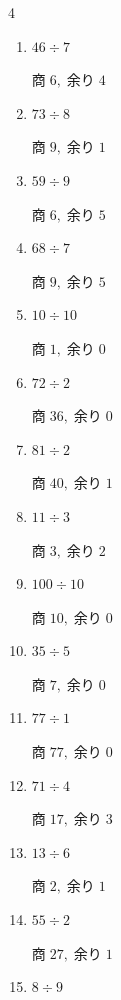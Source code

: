 \begin{multicols}{4}
\begin{enumerate}
        $商\; 9,\; 余り\; 1$

  \item $46 \div 7$

        $商\; 6,\; 余り\; 4$

  \item $73 \div 8$

        $商\; 9,\; 余り\; 1$

  \item $59 \div 9$

        $商\; 6,\; 余り\; 5$

\columnbreak %

  \item $68 \div 7$

        $商\; 9,\; 余り\; 5$

  \item $10 \div 10$

        $商\; 1,\; 余り\; 0$

  \item $72 \div 2$

        $商\; 36,\; 余り\; 0$

  \item $81 \div 2$

        $商\; 40,\; 余り\; 1$

  \item $11 \div 3$

        $商\; 3,\; 余り\; 2$

  \item $100 \div 10$

        $商\; 10,\; 余り\; 0$

  \item $35 \div 5$

        $商\; 7,\; 余り\; 0$

  \item $77 \div 1$

        $商\; 77,\; 余り\; 0$

  \item $71 \div 4$

        $商\; 17,\; 余り\; 3$

  \item $13 \div 6$

        $商\; 2,\; 余り\; 1$

  \item $55 \div 2$

        $商\; 27,\; 余り\; 1$

  \item $8 \div 9$


\end{enumerate}
\end{multicols}
